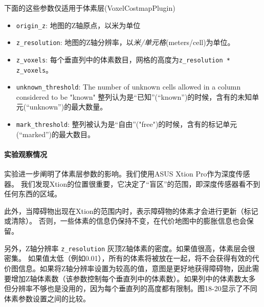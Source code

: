 下面的这些参数仅适用于体素层(VoxelCostmapPlugin)
\begin{itemize}
	\item \texttt{origin_z}: 
	地图的Z轴原点，以米为单位
	\item \texttt{z_resolution}: 
	地图的Z轴分辨率，以\emph{米/单元格}(meters/cell)为单位。
	
	\item \texttt{z_voxels}: 
	每个垂直列中的体素数目，网格的高度为\texttt{z_resolution * z_voxels}。
	
	\item \texttt{unknown_threshold}: 
	The number of unknown cells allowed in a column considered to be "known"
	整列认为是“已知”(``known'')的时候，含有的未知单元(“unknown”)的最大数量。
	
	\item \texttt{mark_threshold}: 
	整列被认为是“自由”("free")的时候，含有的标记单元(“marked”)的最大数目。
	
\end{itemize}

\paragraph[Experiment observations]{实验观察情况}%

实验进一步阐明了体素层参数的影响。我们使用ASUS Xtion Pro作为深度传感器。 我们发现Xtion的位置很重要，它决定了“盲区”的范围，即深度传感器看不到任何东西的区域。

此外，当障碍物出现在Xtion的范围内时，表示障碍物的体素才会进行更新（标记或清除）。
否则，一些体素的信息仍保持不变，在代价地图中的膨胀信息也会保留。

另外，Z轴分辨率 \texttt{z_resolution} 灰顶Z轴体素的密度。如果值很高，体素层会很密集。
如果值太低（例如0.01），所有的体素将被放在一起，将不会获得有效的代价图信息。如果将Z轴分辨率设置为较高的值，意图是更好地获得障碍物，因此需要增加Z轴体素数（该参数控制每个垂直列中的体素数）。如果列中的体素数太多但分辨率不够也是没用的，因为每个垂直列的高度都有限制。图18-20显示了不同体素参数设置之间的比较。

